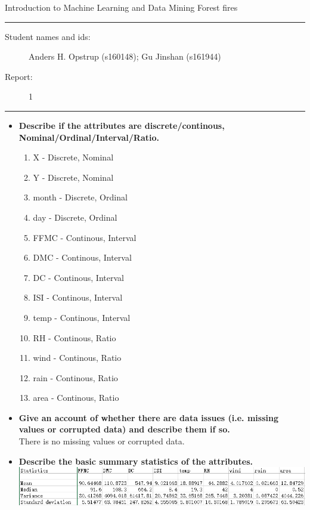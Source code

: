 \documentclass[11pt]{article}
\begin{document}
\begin{center}
{{\Large \sc Introduction to Machine Learning and Data Mining}} \newline	
{{\Large \sc Forest fires}}
\end{center}
\rule{\textwidth}{1pt}
\begin{description}
\item[Student names and ids:] Anders H. Opstrup (s160148); Gu Jinshan (s161944)
\item[Report:] 1
\end{description}
\rule{\textwidth}{1pt}



\begin{itemize}
\item \textbf{Describe if the attributes are discrete/continous, Nominal/Ordinal/Interval/Ratio.}
	\begin{enumerate}
	\item X - Discrete, Nominal
	\item Y - Discrete, Nominal
	\item month - Discrete, Ordinal
	\item day - Discrete, Ordinal
	\item FFMC - Continous, Interval
	\item DMC - Continous, Interval
	\item DC - Continous, Interval
	\item ISI - Continous, Interval
	\item temp - Continous, Interval
	\item RH - Continous, Ratio
	\item wind - Continous, Ratio
	\item rain - Continous, Ratio
	\item area - Continous, Ratio
	\end{enumerate}
\item \textbf{Give an account of whether there are data issues (i.e. missing values or corrupted data) and describe them if so.}\\
There is no missing values or corrupted data.
\item \textbf{Describe the basic summary statistics of the attributes.}\\
\includegraphics[width=\textwidth]{summary_statistics.png}
\end{itemize}
	



\end{document}
